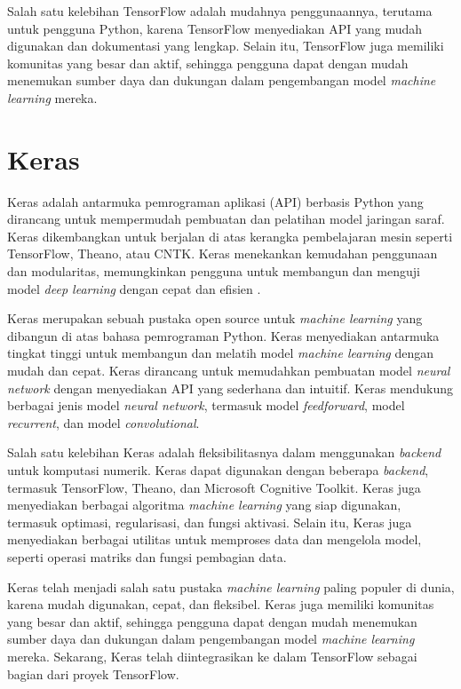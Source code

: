 Salah satu kelebihan TensorFlow adalah mudahnya penggunaannya, terutama untuk pengguna Python, karena TensorFlow menyediakan API yang mudah digunakan dan dokumentasi yang lengkap. Selain itu, TensorFlow juga memiliki komunitas yang besar dan aktif, sehingga pengguna dapat dengan mudah menemukan sumber daya dan dukungan dalam pengembangan model \textit{machine learning} mereka.

\section{Keras}
Keras adalah antarmuka pemrograman aplikasi (API) berbasis Python yang dirancang untuk mempermudah pembuatan dan pelatihan model jaringan saraf. Keras dikembangkan untuk berjalan di atas kerangka pembelajaran mesin seperti TensorFlow, Theano, atau CNTK. Keras menekankan kemudahan penggunaan dan modularitas, memungkinkan pengguna untuk membangun dan menguji model \textit{deep learning} dengan cepat dan efisien \cite{chicho2021}.

Keras merupakan sebuah pustaka open source untuk \textit{machine learning} yang dibangun di atas bahasa pemrograman Python. Keras menyediakan antarmuka tingkat tinggi untuk membangun dan melatih model \textit{machine learning} dengan mudah dan cepat. Keras dirancang untuk memudahkan pembuatan model \textit{neural network} dengan menyediakan API yang sederhana dan intuitif. Keras mendukung berbagai jenis model \textit{neural network}, termasuk model \textit{feedforward}, model \textit{recurrent}, dan model \textit{convolutional}.  

Salah satu kelebihan Keras adalah fleksibilitasnya dalam menggunakan \textit{backend} untuk komputasi numerik. Keras dapat digunakan dengan beberapa \textit{backend}, termasuk TensorFlow, Theano, dan Microsoft Cognitive Toolkit. Keras juga menyediakan berbagai algoritma \textit{machine learning} yang siap digunakan, termasuk optimasi, regularisasi, dan fungsi aktivasi. Selain itu, Keras juga menyediakan berbagai utilitas untuk memproses data dan mengelola model, seperti operasi matriks dan fungsi pembagian data.

Keras telah menjadi salah satu pustaka \textit{machine learning} paling populer di dunia, karena mudah digunakan, cepat, dan fleksibel. Keras juga memiliki komunitas yang besar dan aktif, sehingga pengguna dapat dengan mudah menemukan sumber daya dan dukungan dalam pengembangan model \textit{machine learning} mereka. Sekarang, Keras telah diintegrasikan ke dalam TensorFlow sebagai bagian dari proyek TensorFlow.


